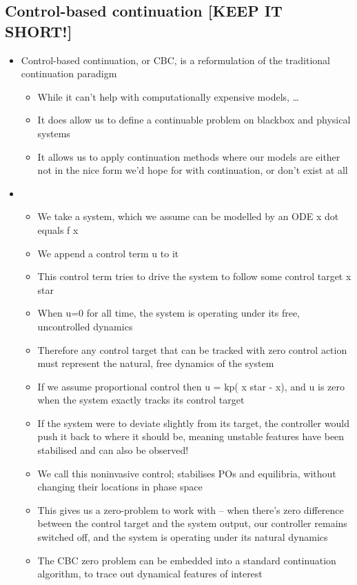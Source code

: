 \documentclass[11pt]{article}
\begin{document}
\subsection{Control-based continuation [KEEP IT SHORT!]}
\label{sec:org1e3ab4f}

\begin{itemize}
\item Control-based continuation, or CBC, is a reformulation of the traditional continuation paradigm
\begin{itemize}
\item While it can't help with computationally expensive models, \ldots{}
\item It does allow us to define a continuable problem on blackbox and physical systems
\item It allows us to apply continuation methods where our models are either not in the nice form we'd hope for with continuation, or don't exist at all
\end{itemize}

\item{}
\begin{itemize}
\item We take a system, which we assume can be modelled by an ODE x dot equals f x
\item We append a control term u to it
\item This control term tries to drive the system to follow some control target x star
\item When u=0 for all time, the system is operating under its free, uncontrolled dynamics
\item Therefore any control target that can be tracked with zero control action must represent the natural, free dynamics of the system
\item If we assume proportional control then u = kp( x star - x), and u is zero when the system exactly tracks its control target
\item If the system were to deviate slightly from its target, the controller would push it back to where it should be, meaning unstable features have been stabilised and can also be observed!
\item We call this noninvasive control; stabilises POs and equilibria, without changing their locations in phase space
\item This gives us a zero-problem to work with -- when there's zero difference between the control target and the system output, our controller remains switched off, and the system is operating under its natural dynamics
\item The CBC zero problem can be embedded into a standard continuation algorithm, to trace out dynamical features of interest
\end{itemize}


\end{itemize}
\end{document}
